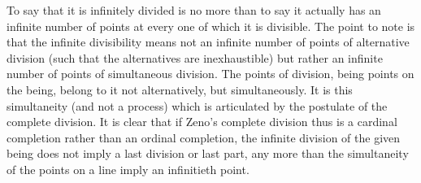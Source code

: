\documentclass[preview]{standalone}
\begin{document}
\begin{center}
To say that it is infinitely divided is no more than to say it actually has an infinite number of points at every one of which it is divisible. The point to note is that the infinite divisibility means not an infinite number of points of alternative division (such that the alternatives are inexhaustible) but rather an infinite number of points of simultaneous division. The points of division, being points on the being, belong to it not alternatively, but simultaneously. It is this simultaneity (and not a process) which is articulated by the postulate of the complete division. It is clear that if Zeno’s complete division thus is a cardinal completion rather than an ordinal completion, the infinite division of the given being does not imply a last division or last part, any more than the simultaneity of the points on a line imply an infinitieth point.
\end{center}
\end{document}
